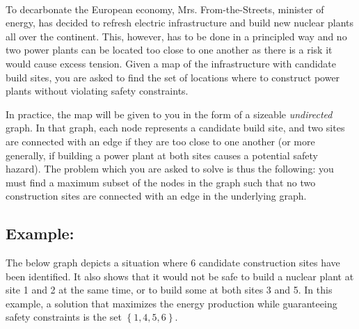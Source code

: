 \documentclass[12pt]{report}
\begin{document}
	\newpage
	\begin{Exercise}[title={Building Nuclear Plants}]
		\\
		To decarbonate the European economy, Mrs. From-the-Streets, minister of energy,
		has decided to refresh electric infrastructure and build new nuclear plants all over the
		continent. This, however, has to be done in a principled way and no two power plants can
		be located too close to one another as there is a risk it would cause excess tension.
		Given a map of the infrastructure with candidate build sites, you are asked to find
		the set of locations where to construct power plants without violating safety constraints.

		In practice, the map will be given to you in the form of a sizeable \emph{undirected} graph.
		In that graph, each node represents a candidate build site, and two sites are connected
		with an edge if they are too close to one another (or more generally, if building a power
		plant at both sites causes a potential safety hazard). The problem which you are asked to
		solve is thus the following: you must find a maximum subset of the nodes in the graph
		such that no two construction sites are connected with an edge in the underlying graph.

		\subsection*{Example:}
		The below graph depicts a situation where 6 candidate construction sites have been identified.
		It also shows that it would not be safe to build a nuclear plant at site 1 and 2 at the same
		time, or to build some at both sites 3 and 5. In this example, a solution that maximizes the
		energy production while guaranteeing safety constraints is the set $\left\{ 1, 4, 5, 6 \right\}$.

		\begin{center}
\end{center}
\end{Exercise}
\end{document}
